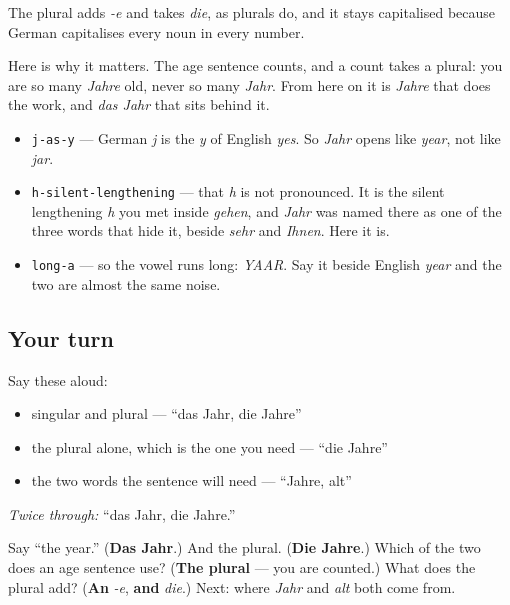 The plural adds \emph{-e} and takes \emph{die}, as plurals do, and it stays capitalised because German capitalises every noun in every number.

Here is why it matters. The age sentence counts, and a count takes a plural: you are so many \emph{Jahre} old, never so many \emph{Jahr}. From here on it is \emph{Jahre} that does the work, and \emph{das Jahr} that sits behind it.

\begin{sounds}
\begin{itemize}
\raggedright
  \item \texttt{j-as-y} — German \emph{j} is the \emph{y} of English \emph{yes}. So \emph{Jahr} opens like \emph{year}, not like \emph{jar}.
  \item \texttt{h-silent-lengthening} — that \emph{h} is not pronounced. It is the silent lengthening \emph{h} you met inside \emph{gehen}, and \emph{Jahr} was named there as one of the three words that hide it, beside \emph{sehr} and \emph{Ihnen}. Here it is.
  \item \texttt{long-a} — so the vowel runs long: \emph{YAAR}. Say it beside English \emph{year} and the two are almost the same noise.
\end{itemize}
\end{sounds}

\subsection*{Your turn}
Say these aloud:

\begin{itemize}
\raggedright
  \item singular and plural — \textquotedblleft{}das Jahr, die Jahre\textquotedblright{}
  \item the plural alone, which is the one you need — \textquotedblleft{}die Jahre\textquotedblright{}
  \item the two words the sentence will need — \textquotedblleft{}Jahre, alt\textquotedblright{}
\end{itemize}

\emph{Twice through:} \textquotedblleft{}das Jahr, die Jahre.\textquotedblright{}

\begin{tcolorbox}[breakable,colback=teal!4,colframe=teal!35!black,title={Before you move on}]
Say \textquotedblleft{}the year.\textquotedblright{} (\textbf{Das Jahr}.) And the plural. (\textbf{Die Jahre}.) Which of the two does an age sentence use? (\textbf{The plural} — you are counted.) What does the plural add? (\textbf{An} \emph{-e}, \textbf{and} \emph{die}.) Next: where \emph{Jahr} and \emph{alt} both come from.
\end{tcolorbox}

